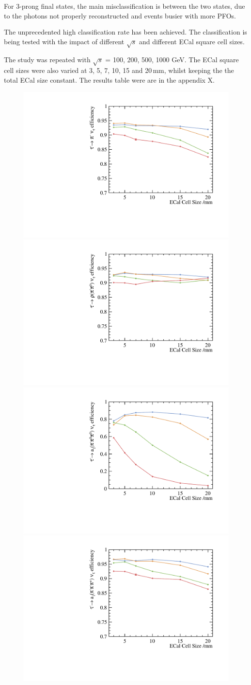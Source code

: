 \documentclass[a4paper,11pt]{article}
\newcommand{\rootS}{\ensuremath{\sqrt{s}} }
\begin{document}
For 3-prong final states, the main misclassification is between the two states, due to the photons not properly reconstructed and events busier with more PFOs. 

The unprecedented high classification rate has been achieved. The classification is being tested with the impact of different \rootS and different ECal  square cell sizes.



The study was repeated with  \rootS = 100, 200, 500, 1000 GeV. The ECal square cell sizes were also varied at 3, 5, 7, 10, 15 and 20\,mm, whilst keeping the the total ECal size constant. The results table were are in the appendix X. 

\begin{figure}[htbp]
\centering %
\includegraphics[width=.45\textwidth]{plots/decayMode2}
\qquad
\includegraphics[width=.45\textwidth]{plots/decayMode3} 
\qquad
\includegraphics[width=.45\textwidth]{plots/decayMode4} 
\qquad
\includegraphics[width=.45\textwidth]{plots/decayMode5}

\end{figure}
\end{document}
